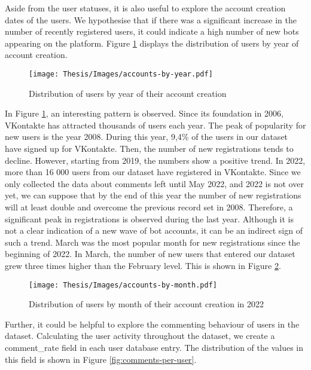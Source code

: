 Aside from the user statuses, it is also useful to explore the account creation dates of the users. We hypothesise that if there was a significant increase in the number of recently registered users, it could indicate a high number of new bots appearing on the platform. Figure \ref{fig:users-by-year} displays the distribution of users by year of account creation.

\begin{figure}
	\centering
	\texttt{[image: Thesis/Images/accounts-by-year.pdf]}
	\caption{Distribution of users by year of their account creation}
	\label{fig:users-by-year}
\end{figure}

In Figure \ref{fig:users-by-year}, an interesting pattern is observed. Since its foundation in 2006, VKontakte has attracted thousands of users each year. The peak of popularity for new users is the year 2008. During this year, 9,4\% of the users in our dataset have signed up for VKontakte. Then, the number of new registrations tends to decline. However, starting from 2019, the numbers show a positive trend. In 2022, more than 16 000 users from our dataset have registered in VKontakte. Since we only collected the data about comments left until May 2022, and 2022 is not over yet, we can suppose that by the end of this year the number of new registrations will at least double and overcome the previous record set in 2008. Therefore, a significant peak in registrations is observed during the last year. Although it is not a clear indication of a new wave of bot accounts, it can be an indirect sign of such a trend. March was the most popular month for new registrations since the beginning of 2022. In March, the number of new users that entered our dataset grew three times higher than the February level. This is shown in Figure \ref{fig:users-by-month}.

\begin{figure}
	\centering
	\texttt{[image: Thesis/Images/accounts-by-month.pdf]}
	\caption{Distribution of users by month of their account creation in 2022}
	\label{fig:users-by-month}
\end{figure}

Further, it could be helpful to explore the commenting behaviour of users in the dataset. Calculating the user activity throughout the dataset, we create a comment\_rate field in each user database entry. The distribution of the values in this field is shown in Figure \ref{fig:comments-per-user}.

